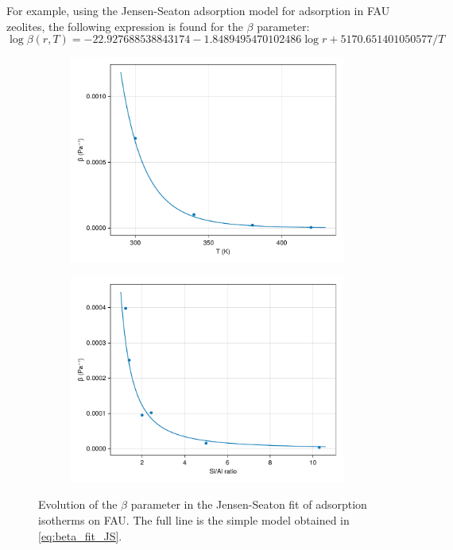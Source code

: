 \documentclass[main.tex]{subfiles}
\begin{document}
For example, using the Jensen-Seaton adsorption model for  adsorption in FAU zeolites, the following expression is found for the $\beta$ parameter:
\[\log \beta(r, T) = -22.927688538843174 -1.8489495470102486\log r + 5170.651401050577/T\label{eq:beta_fit_JS}\]

\begin{figure}
	\begin{subfigure}{0.49\columnwidth}
		\includegraphics[width=\columnwidth]{figures/isotherms/evolution_beta_temperature.pdf}
		\label{subfig:beta_temperature}
	\end{subfigure}\hfill%
	\begin{subfigure}{0.49\columnwidth}
		\includegraphics[width=\columnwidth]{figures/isotherms/evolution_beta_ratio.pdf}
		\label{subfig:beta_ratio}
	\end{subfigure}
	\caption{Evolution of the $\beta$ parameter in the Jensen-Seaton fit of  adsorption isotherms on FAU. The full line is the simple model obtained in \cref{eq:beta_fit_JS}.}\label{fig:beta_evolution}
\end{figure}
\end{document}

